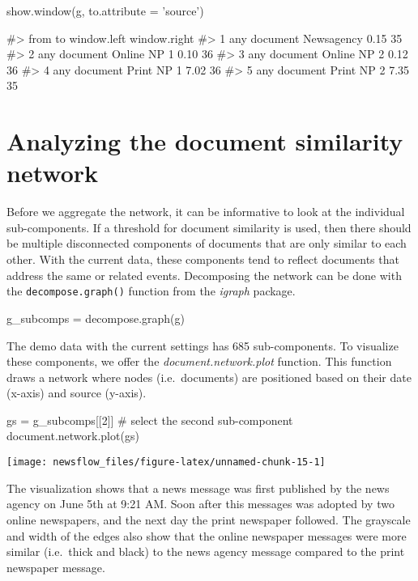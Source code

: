 \begin{Schunk}
\begin{Sinput}
show.window(g, to.attribute = 'source')
\end{Sinput}
\begin{Soutput}
#>           from          to window.left window.right
#> 1 any document  Newsagency        0.15           35
#> 2 any document Online NP 1        0.10           36
#> 3 any document Online NP 2        0.12           36
#> 4 any document  Print NP 1        7.02           36
#> 5 any document  Print NP 2        7.35           35
\end{Soutput}
\end{Schunk}

\section{Analyzing the document similarity network}

Before we aggregate the network, it can be informative to look at the
individual sub-components. If a threshold for document similarity is
used, then there should be multiple disconnected components of documents
that are only similar to each other. With the current data, these
components tend to reflect documents that address the same or related
events. Decomposing the network can be done with the
\texttt{decompose.graph()} function from the \emph{igraph} package.

\begin{Schunk}
\begin{Sinput}
g_subcomps = decompose.graph(g)
\end{Sinput}
\end{Schunk}

The demo data with the current settings has 685 sub-components. To
visualize these components, we offer the \emph{document.network.plot}
function. This function draws a network where nodes (i.e.~documents) are
positioned based on their date (x-axis) and source (y-axis).

\begin{Schunk}
\begin{Sinput}
gs = g_subcomps[[2]] # select the second sub-component
document.network.plot(gs)
\end{Sinput}

\texttt{[image: newsflow\_files/figure-latex/unnamed-chunk-15-1]} \end{Schunk}

The visualization shows that a news message was first published by the
news agency on June 5th at 9:21 AM. Soon after this messages was adopted
by two online newspapers, and the next day the print newspaper followed.
The grayscale and width of the edges also show that the online newspaper
messages were more similar (i.e.~thick and black) to the news agency
message compared to the print newspaper message.

